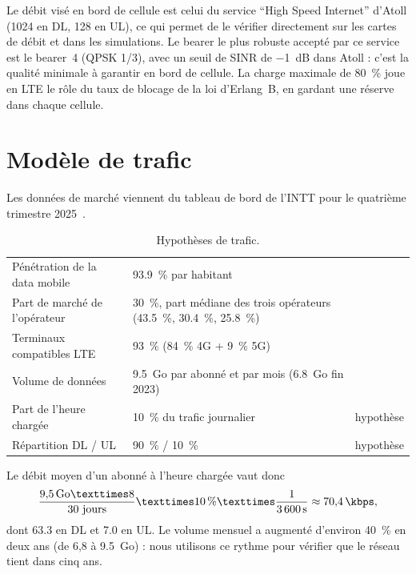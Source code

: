Le débit visé en bord de cellule est celui du service \enquote{High Speed Internet} d'Atoll (\SI{1024}{\kbps} en DL, \SI{128}{\kbps} en UL), ce qui permet de le vérifier directement sur les cartes de débit et dans les simulations. Le bearer le plus robuste accepté par ce service est le bearer~4 (QPSK 1/3), avec un seuil de SINR de \SI{-1}{\deci\bel} dans Atoll : c'est la qualité minimale à garantir en bord de cellule. La charge maximale de \SI{80}{\percent} joue en LTE le rôle du taux de blocage de la loi d'Erlang~B, en gardant une réserve dans chaque cellule.

\section{Modèle de trafic}
\label{sec-trafic}

Les données de marché viennent du tableau de bord de l'INTT pour le quatrième trimestre 2025~\cite{intt2025tr4}.

\begin{table}[H]
\centering
\caption{Hypothèses de trafic.}
\label{tab-trafic}
\begin{tabularx}{\textwidth}{@{}lLl@{}}
\toprule
{} &  &  \\
\midrule
Pénétration de la data mobile & \SI{93,9}{\percent} par habitant & \cite{intt2025tr4} \\
Part de marché de l'opérateur & \SI{30}{\percent}, part médiane des trois opérateurs (\SI{43,5}{\percent}, \SI{30,4}{\percent}, \SI{25,8}{\percent}) & \cite{intt2025tr4} \\
Terminaux compatibles LTE & \SI{93}{\percent} (\SI{84}{\percent} 4G + \SI{9}{\percent} 5G) & \cite{intt2025tr4} \\
Volume de données & \SI{9,5}{Go} par abonné et par mois (\SI{6,8}{Go} fin 2023) & \cite{intt2025tr4} \\
Part de l'heure chargée & \SI{10}{\percent} du trafic journalier & hypothèse \\
Répartition DL / UL & \SI{90}{\percent} / \SI{10}{\percent} & hypothèse \\
\bottomrule
\end{tabularx}
\end{table}

Le débit moyen d'un abonné à l'heure chargée vaut donc
\begin{equation}
  \frac{\SI{9,5}{Go} × 8}{30~\text{jours}} × \SI{10}{\percent} × \frac{1}{\SI{3600}{\second}} \approx \SI{70,4}{\kbps},
\end{equation}
dont \SI{63,3}{\kbps} en DL et \SI{7,0}{\kbps} en UL. Le volume mensuel a augmenté d'environ \SI{40}{\percent} en deux ans (de 6,8 à \SI{9,5}{Go}) : nous utilisons ce rythme pour vérifier que le réseau tient dans cinq ans.
